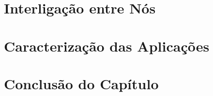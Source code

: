 \documentclass[tese,capa]{texufpel}
\begin{document}

\section{Interligação entre Nós}\label{sec:rede}
\section{Caracterização das Aplicações}\label{sec:caracaplic}
\section{Conclusão do Capítulo}\label{sec:concap}



\end{document}
